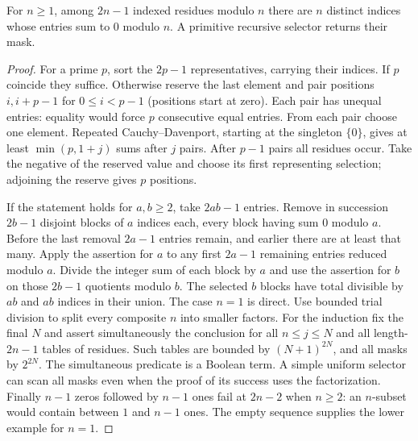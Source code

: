 \begin{theorem}\label{result62}
For $n\ge1$, among $2n-1$ indexed residues modulo $n$ there are $n$ distinct indices whose entries sum to $0$ modulo $n$. A primitive recursive selector returns their mask.
\end{theorem}
\begin{proof}
For a prime $p$, sort the $2p-1$ representatives, carrying their indices. If $p$ coincide they suffice. Otherwise reserve the last element and pair positions $i,i+p-1$ for $0\le i<p-1$ (positions start at zero). Each pair has unequal entries: equality would force $p$ consecutive equal entries. From each pair choose one element. Repeated Cauchy--Davenport, starting at the singleton $\{0\}$, gives at least $\min(p,1+j)$ sums after $j$ pairs. After $p-1$ pairs all residues occur. Take the negative of the reserved value and choose its first representing selection; adjoining the reserve gives $p$ positions.

If the statement holds for $a,b\ge2$, take $2ab-1$ entries. Remove in succession $2b-1$ disjoint blocks of $a$ indices each, every block having sum $0$ modulo $a$. Before the last removal $2a-1$ entries remain, and earlier there are at least that many. Apply the assertion for $a$ to any first $2a-1$ remaining entries reduced modulo $a$. Divide the integer sum of each block by $a$ and use the assertion for $b$ on those $2b-1$ quotients modulo $b$. The selected $b$ blocks have total divisible by $ab$ and $ab$ indices in their union. The case $n=1$ is direct. Use bounded trial division to split every composite $n$ into smaller factors. For the induction fix the final $N$ and assert simultaneously the conclusion for all $n\le j\le N$ and all length-$2n-1$ tables of residues. Such tables are bounded by $(N+1)^{2N}$, and all masks by $2^{2N}$. The simultaneous predicate is a Boolean term. A simple uniform selector can scan all masks even when the proof of its success uses the factorization. Finally $n-1$ zeros followed by $n-1$ ones fail at $2n-2$ when $n\ge2$: an $n$-subset would contain between $1$ and $n-1$ ones. The empty sequence supplies the lower example for $n=1$.
\end{proof}

